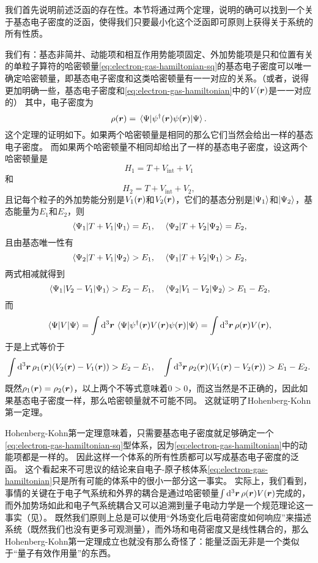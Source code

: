 我们首先说明前述泛函的存在性。本节将通过两个定理，说明的确可以找到一个关于基态电子密度的泛函，使得我们只要最小化这个泛函即可原则上获得关于系统的所有性质。

我们有：基态非简并、动能项和相互作用势能项固定、外加势能项是只和位置有关的单粒子算符的哈密顿量\eqref{eq:electron-gas-hamiltonian-sq}的基态电子密度可以唯一确定哈密顿量，即基态电子密度和这类哈密顿量有一一对应的关系。（或者，说得更加明确一些，基态电子密度和\eqref{eq:electron-gas-hamiltonian}中的$V(\vb*{r})$是一一对应的）
其中，电子密度为
\begin{equation}
    \rho(\vb*{r}) = \mel{\Psi}{{\psi}^\dagger(\vb*{r}) {\psi}(\vb*{r})}{\Psi}.
\end{equation}
这个定理的证明如下。如果两个哈密顿量是相同的那么它们当然会给出一样的基态电子密度。
而如果两个哈密顿量不相同却给出了一样的基态电子密度，设这两个哈密顿量是
\[
    {H}_1 = {T} + {V}_\text{int} + {V}_1
\]
和
\[
    {H}_2 = {T} + {V}_\text{int} + {V}_2,
\]
且记每个粒子的外加势能分别是$V_1(\vb*{r})$和$V_2(\vb*{r})$，它们的基态分别是$\ket{\Psi_1}$和$\ket{\Psi_2}$，基态能量为$E_1$和$E_2$，则
\[
    \mel{\Psi_1}{{T} + {V}_1}{\Psi_1} = E_1, \quad \mel{\Psi_2}{{T} + {V}_2}{\Psi_2} = E_2,
\]
且由基态唯一性有
\[
    \mel{\Psi_2}{{T} + {V}_1}{\Psi_2} > E_1, \quad \mel{\Psi_1}{{T} + {V}_2}{\Psi_1} > E_2,
\]
两式相减就得到
\[
    \mel{\Psi_1}{{V}_2 - {V}_1}{\Psi_1} > E_2 - E_1, \quad \mel{\Psi_2}{{V}_1 - {V}_2}{\Psi_2} > E_1 - E_2,
\]
而
\[
    \mel{\Psi}{{V}}{\Psi} = \int \dd[3]{\vb*{r}} \mel{\Psi}{{\psi}^\dagger(\vb*{r}) V(\vb*{r}) {\psi}(\vb*{r})}{\Psi} = \int \dd[3]{\vb*{r}} \rho(\vb*{r}) V(\vb*{r}),
\]
于是上式等价于
\[
    \int \dd[3]{\vb*{r}} \rho_1(\vb*{r}) (V_2(\vb*{r}) - V_1(\vb*{r})) > E_2 - E_1, \quad \int \dd[3]{\vb*{r}} \rho_2(\vb*{r}) (V_1(\vb*{r}) - V_2(\vb*{r})) > E_1 - E_2.
\]
既然$\rho_1(\vb*{r}) = \rho_2(\vb*{r})$，以上两个不等式意味着$0 > 0$，而这当然是不正确的，因此如果基态电子密度一样，那么哈密顿量就不可能不同。
这就证明了Hohenberg-Kohn第一定理。

Hohenberg-Kohn第一定理意味着，只需要基态电子密度就足够确定一个\eqref{eq:electron-gas-hamiltonian-sq}型体系，因为\eqref{eq:electron-gas-hamiltonian}中的动能项都是一样的。
因此这样一个体系的所有性质都可以写成基态电子密度的泛函。
这个看起来不可思议的结论来自电子-原子核体系\eqref{eq:electron-gas-hamiltonian}只是所有可能的体系中的很小一部分这一事实。
实际上，我们看到，事情的关键在于电子气系统和外界的耦合是通过哈密顿量$\int \dd[3]{\vb*{r}} \rho(\vb*{r}) V(\vb*{r})$完成的，而外加势场如此和电子气系统耦合又可以追溯到量子电动力学是一个规范理论这一事实（见）。
既然我们原则上总是可以使用“外场变化后电荷密度如何响应”来描述系统（既然我们也没有更多可观测量），而外场和电荷密度又是线性耦合的，那么Hohenberg-Kohn第一定理成立也就没有那么奇怪了：能量泛函无非是一个类似于“量子有效作用量”的东西。

